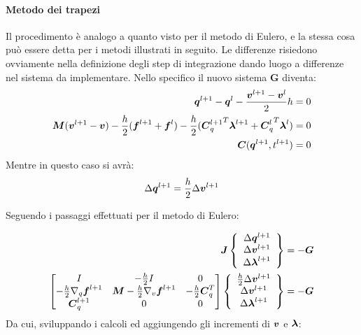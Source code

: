 \paragraph{Metodo dei trapezi }
Il procedimento è analogo a quanto visto per il metodo di Eulero, e la stessa cosa può essere detta per i metodi illustrati in seguito. Le differenze risiedono ovviamente nella definizione degli step di integrazione dando luogo a differenze nel sistema da implementare. Nello specifico il nuovo sistema \textbf{G} diventa:
\begin{align} \label{eq:trap_Gq}
    {\boldsymbol{q}}^{l+1}-{\boldsymbol{q}}^l - \frac{{\boldsymbol{v}}^{l+1}-{\boldsymbol{v}}^l}{2} h &= 0 \\ \label{eq:trap_Gv}
    {\boldsymbol{M}}({\boldsymbol{v}}^{l+1} -{\boldsymbol{v}}) - \frac{h}{2}({\boldsymbol{f}}^{l+1} + {\boldsymbol{f}}^l )
    - \frac{h}{2}({{\boldsymbol{C}}_q^{l+1}}^T {\boldsymbol{\lambda}}^{l+1} + {{\boldsymbol{C}}_q^l}^T {\boldsymbol{\lambda}}^l) &= 0 \\ \label{eq:trap_Glam} {\boldsymbol{C}}({\boldsymbol{q}}^{l+1} , t^{l+1}) &= 0
\end{align}
Mentre in questo caso si avrà:
\begin{equation}
    \Delta {\boldsymbol{q}}^{l+1} = \frac{h}{2} \Delta {\boldsymbol{v}}^{l+1}
\end{equation}

Seguendo i passaggi effettuati per il metodo di Eulero:

\begin{align} \nonumber
{\boldsymbol{J}} \left\{\begin{array}{c}\Delta{\boldsymbol{q}}^{l+1} \\ \Delta{\boldsymbol{v}}^{l+1}  
        \\ \Delta{\boldsymbol{\lambda}}^{l+1} \end{array} \right\} = -{\boldsymbol{G}}
\\
\begin{bmatrix} I & -\frac{h}{2}I   & 0 \\
-\frac{h}{2}\nabla_q{\boldsymbol{f}}^{l+1} & {\boldsymbol{M}}-\frac{h}{2}\nabla_v{\boldsymbol{f}}^{l+1} &-\frac{h}{2}{\boldsymbol{C}}_q^T \\
    {\boldsymbol{C}}_q^{l+1}              &  0                                 &    0  \end{bmatrix}
    \left\{\begin{array}{c}\frac{h}{2}\Delta{\boldsymbol{v}}^{l+1} \\ \Delta{\boldsymbol{v}}^{l+1} 
    \\ \Delta{\boldsymbol{\lambda}}^{l+1} \end{array} \right\}
    = - {\boldsymbol{G}}
\end{align}
Da cui, sviluppando i calcoli ed aggiungendo gli incrementi di ${\boldsymbol{v}}$ e ${\boldsymbol{\lambda}}$:

